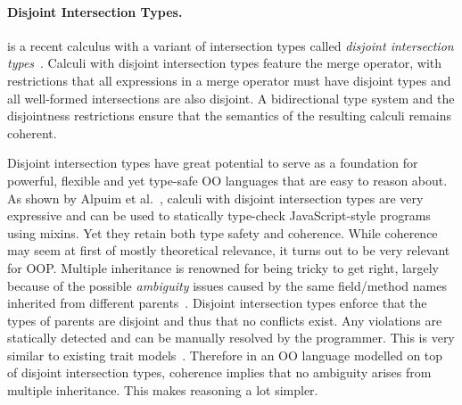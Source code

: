 \paragraph{Disjoint Intersection Types.}
\oname is a recent calculus with a variant of intersection types 
called \emph{disjoint intersection types}~\cite{oliveira2016disjoint}.
Calculi with disjoint intersection types feature the merge 
operator, with restrictions that all expressions in a merge 
operator must have disjoint types and all well-formed intersections 
are also disjoint. A bidirectional type system and the disjointness restrictions 
ensure that the semantics of the resulting calculi remains 
coherent. 

\begin{comment}
The merge operator was introduced by Reynolds 
and Forsythe and adopted by a few other calculi as well~\cite{}.
Unfortunately, while the merge operator is powerful, it makes 
it hard to get a \emph{coherent} semantics. \bruno{what is coherence}
Perhaps because 
of this issue the merge operator has not been adopted by 
many language designs. Disjoint intersection types provide 
a remedy for the coherence problem, by imposing restrictions 
on the uses of merges and on the formation of intersection types. 
\bruno{merge operator ==> models inheritance; intersection types ==> 
model subtyping}

In essence disjoint intersection types retain most of the 
expressive power of the merge operator.
For example, they can 
be used to model powerful forms of extensible records~\cite{}.
\end{comment}

Disjoint intersection types have great potential to serve as a foundation for
powerful, flexible and yet type-safe OO languages that are easy to reason
about. As shown by Alpuim et al.~\cite{alpuimdisjoint}, calculi with disjoint intersection
types are very
expressive and can be used to statically type-check JavaScript-style programs
using mixins. Yet they retain both type safety and coherence. While
coherence may seem at first of mostly theoretical relevance, it
turns out to be very relevant for OOP. Multiple
inheritance is renowned for being tricky to get right, largely because of the
possible \emph{ambiguity} issues caused by the same field/method names
inherited from different parents~\cite{bracha1990mixin, scharli2003traits}. Disjoint intersection types
enforce that the types of parents are disjoint and thus that no conflicts exist.
Any violations are statically detected and can be manually resolved by the
programmer.
This is very similar
to existing trait models~\cite{fisher2004typed,
  ducasse2006traits}. Therefore in an OO language
modelled on top of disjoint intersection types, coherence implies
that no ambiguity arises from multiple inheritance. This makes
reasoning a lot simpler.

